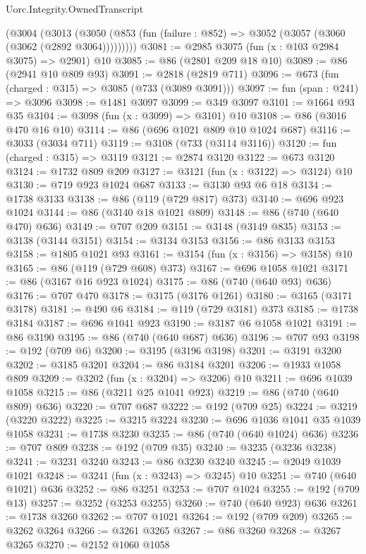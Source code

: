 \begin{lexlean}{Uorc.Integrity.OwnedTranscript}
\begin{coremodule}
    (@3004
      (@3013 (@3050 (@853 (fun (failure : @852) => @3052 (@3057 (@3060 (@3062 (@2892 @3064)))))))))
@3081 := @2985 @3075 (fun (x : @103 @2984 @3075) => @2901) @10
@3085 := @86 (@2801 @209 @18 @10)
@3089 := @86 (@2941 @10 @809 @93)
@3091 := @2818 (@2819 @711)
@3096 := @673 (fun (charged : @315) => @3085 (@733 (@3089 @3091)))
@3097 := fun (span : @241) => @3096
@3098 := @1481 @3097
@3099 := @349 @3097
@3101 := @1664 @93 @35
@3104 := @3098 (fun (x : @3099) => @3101) @10
@3108 := @86 (@3016 @470 @16 @10)
@3114 := @86 (@696 @1021 @809 @10 @1024 @687)
@3116 := @3033 (@3034 @711)
@3119 := @3108 (@733 (@3114 @3116))
@3120 := fun (charged : @315) => @3119
@3121 := @2874 @3120
@3122 := @673 @3120
@3124 := @1732 @809 @209
@3127 := @3121 (fun (x : @3122) => @3124) @10
@3130 := @719 @923 @1024 @687
@3133 := @3130 @93 @6 @18
@3134 := @1738 @3133
@3138 := @86 (@119 (@729 @817) @373)
@3140 := @696 @923 @1024
@3144 := @86 (@3140 @18 @1021 @809)
@3148 := @86 (@740 (@640 @470) @636)
@3149 := @707 @209
@3151 := @3148 (@3149 @835)
@3153 := @3138 (@3144 @3151)
@3154 := @3134 @3153
@3156 := @86 @3133 @3153
@3158 := @1805 @1021 @93
@3161 := @3154 (fun (x : @3156) => @3158) @10
@3165 := @86 (@119 (@729 @608) @373)
@3167 := @696 @1058 @1021
@3171 := @86 (@3167 @16 @923 @1024)
@3175 := @86 (@740 (@640 @93) @636)
@3176 := @707 @470
@3178 := @3175 (@3176 @1261)
@3180 := @3165 (@3171 @3178)
@3181 := @490 @6
@3184 := @119 (@729 @3181) @373
@3185 := @1738 @3184
@3187 := @696 @1041 @923
@3190 := @3187 @6 @1058 @1021
@3191 := @86 @3190
@3195 := @86 (@740 (@640 @687) @636)
@3196 := @707 @93
@3198 := @192 (@709 @6)
@3200 := @3195 (@3196 @3198)
@3201 := @3191 @3200
@3202 := @3185 @3201
@3204 := @86 @3184 @3201
@3206 := @1933 @1058 @809
@3209 := @3202 (fun (x : @3204) => @3206) @10
@3211 := @696 @1039 @1058
@3215 := @86 (@3211 @25 @1041 @923)
@3219 := @86 (@740 (@640 @809) @636)
@3220 := @707 @687
@3222 := @192 (@709 @25)
@3224 := @3219 (@3220 @3222)
@3225 := @3215 @3224
@3230 := @696 @1036 @1041 @35 @1039 @1058
@3231 := @1738 @3230
@3235 := @86 (@740 (@640 @1024) @636)
@3236 := @707 @809
@3238 := @192 (@709 @35)
@3240 := @3235 (@3236 @3238)
@3241 := @3231 @3240
@3243 := @86 @3230 @3240
@3245 := @2049 @1039 @1021
@3248 := @3241 (fun (x : @3243) => @3245) @10
@3251 := @740 (@640 @1021) @636
@3252 := @86 @3251
@3253 := @707 @1024
@3255 := @192 (@709 @13)
@3257 := @3252 (@3253 @3255)
@3260 := @740 (@640 @923) @636
@3261 := @1738 @3260
@3262 := @707 @1021
@3264 := @192 (@709 @209)
@3265 := @3262 @3264
@3266 := @3261 @3265
@3267 := @86 @3260
@3268 := @3267 @3265
@3270 := @2152 @1060 @1058

\end{coremodule}
\end{lexlean}
